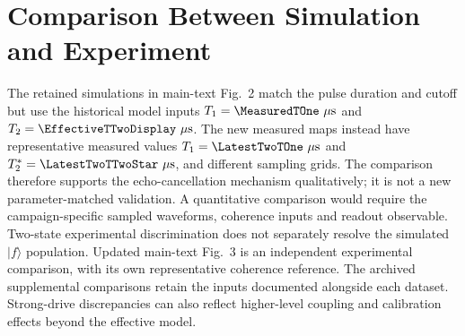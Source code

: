 \section{Comparison Between Simulation and Experiment}
\label{sec:simulation-experiment-comparison}

The retained simulations in main-text Fig.~2 match the pulse duration and
cutoff but use the historical model inputs
$T_1=\MeasuredTOne~\mu\mathrm{s}$ and $T_2=\EffectiveTTwoDisplay~\mu\mathrm{s}$.
The new measured maps instead have representative measured values
$T_1=\LatestTwoTOne~\mu\mathrm{s}$ and
$T_2^*=\LatestTwoTTwoStar~\mu\mathrm{s}$, and different sampling grids.
The comparison therefore supports the echo-cancellation mechanism
qualitatively; it is not a new parameter-matched validation.
A quantitative comparison would require the campaign-specific sampled
waveforms, coherence inputs and readout observable. Two-state experimental
discrimination does not separately resolve the simulated $|f\rangle$
population. Updated main-text Fig.~3 is an independent experimental
comparison, with its own representative coherence reference.
The archived supplemental comparisons retain the inputs documented alongside
each dataset. Strong-drive discrepancies can also reflect higher-level
coupling and calibration effects beyond the effective model.

